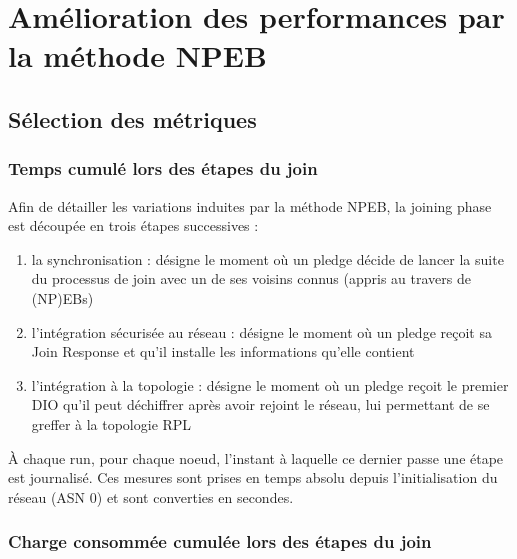 \documentclass[]{report}
\begin{document}
\newpage

\section{Amélioration des performances par la méthode NPEB}
\label{eval_NPEB}


\subsection{Sélection des métriques}

\subsubsection{Temps cumulé lors des étapes du join}
\label{metric_times}

Afin de détailler les variations induites par la méthode NPEB, la joining phase est découpée en trois étapes successives :
\begin{enumerate}
\item la synchronisation : désigne le moment où un pledge décide de lancer la suite du processus de join avec un de ses voisins connus (appris au travers de (NP)EBs)
\item l'intégration sécurisée au réseau : désigne le moment où un pledge reçoit sa Join Response et qu'il installe les informations qu'elle contient
\item l'intégration à la topologie : désigne le moment où un pledge reçoit le premier DIO qu'il peut déchiffrer après avoir rejoint le réseau, lui permettant de se greffer à la topologie RPL
\end{enumerate}
\vspace{0.2cm}
À chaque run, pour chaque noeud, l'instant à laquelle ce dernier passe une étape est journalisé. Ces mesures sont prises en temps absolu depuis l'initialisation du réseau (ASN 0) et sont converties en secondes.

\subsubsection{Charge consommée cumulée lors des étapes du join}
\label{metric_charges}
\end{document}
